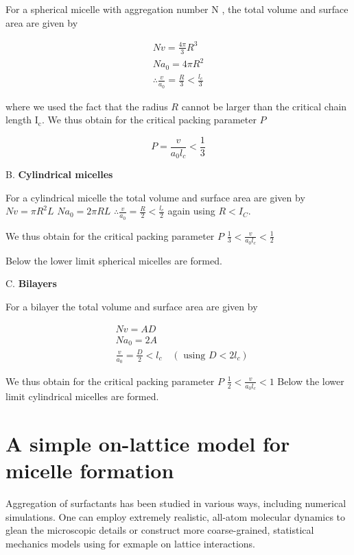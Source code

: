\documentclass[
  letterpaper,
  enabledeprecatedfontcommands]{report}
\begin{document}
For a spherical micelle with aggregation number N , the total volume and
surface area are given by

\[
\begin{gathered}
N v=\frac{4 \pi}{3} R^{3} \\
N a_{0}=4 \pi R^{2} \\
\therefore \frac{v}{a_{0}}=\frac{R}{3}<\frac{l_{c}}{3}
\end{gathered}
\]

where we used the fact that the radius \(R\) cannot be larger than the
critical chain length \(\mathrm{I}_{\mathrm{c}}\). We thus obtain for
the critical packing parameter \(P\)

\[
P=\frac{v}{a_{0} l_{c}}<\frac{1}{3}
\]

B. \textbf{Cylindrical micelles}

For a cylindrical micelle the total volume and surface area are given by
\(N v=\pi R^{2} L\) \(N a_{0}=2 \pi R L\)
\(\therefore \frac{v}{a_{0}}=\frac{R}{2}<\frac{l_{c}}{2}\) again using
\(R<I_{C}\).

We thus obtain for the critical packing parameter \(P\)
\(\frac{1}{3}<\frac{v}{a_{0} l_{c}}<\frac{1}{2}\)

Below the lower limit spherical micelles are formed.

C. \textbf{Bilayers}

For a bilayer the total volume and surface area are given by

\[
\begin{aligned}
& N v=A D \\
& N a_{0}=2 A \\
& \frac{v}{a_{0}}=\frac{D}{2}<l_{c} \quad\left(\text { using } D<2 l_{c}\right)
\end{aligned}
\]

We thus obtain for the critical packing parameter \(P\)
\(\frac{1}{2}<\frac{v}{a_{0} l_{c}}<1\) Below the lower limit
cylindrical micelles are formed.

\section{A simple on-lattice model for micelle
formation}\label{a-simple-on-lattice-model-for-micelle-formation}

Aggregation of surfactants has been studied in various ways, including
numerical simulations. One can employ extremely realistic, all-atom
molecular dynamics to glean the microscopic details or construct more
coarse-grained, statistical mechanics models using for exmaple on
lattice interactions.
\end{document}
